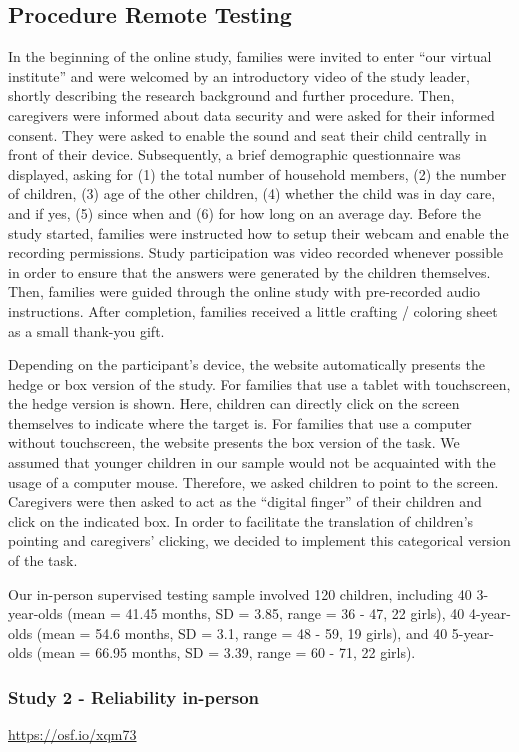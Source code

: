 \documentclass[
  english,
  man,floatsintext]{apa6}
\begin{document}
\hypertarget{procedure-remote-testing}{%
\subsection{Procedure Remote Testing}\label{procedure-remote-testing}}

In the beginning of the online study, families were invited to enter ``our virtual institute'' and were welcomed by an introductory video of the study leader, shortly describing the research background and further procedure. Then, caregivers were informed about data security and were asked for their informed consent. They were asked to enable the sound and seat their child centrally in front of their device. Subsequently, a brief demographic questionnaire was displayed, asking for (1) the total number of household members, (2) the number of children, (3) age of the other children, (4) whether the child was in day care, and if yes, (5) since when and (6) for how long on an average day. Before the study started, families were instructed how to setup their webcam and enable the recording permissions. Study participation was video recorded whenever possible in order to ensure that the answers were generated by the children themselves.
Then, families were guided through the online study with pre-recorded audio instructions. After completion, families received a little crafting / coloring sheet as a small thank-you gift.

Depending on the participant's device, the website automatically presents the hedge or box version of the study. For families that use a tablet with touchscreen, the hedge version is shown. Here, children can directly click on the screen themselves to indicate where the target is. For families that use a computer without touchscreen, the website presents the box version of the task. We assumed that younger children in our sample would not be acquainted with the usage of a computer mouse. Therefore, we asked children to point to the screen. Caregivers were then asked to act as the ``digital finger'' of their children and click on the indicated box. In order to facilitate the translation of children's pointing and caregivers' clicking, we decided to implement this categorical version of the task.

Our in-person supervised testing sample involved 120 children, including 40 3-year-olds (mean = 41.45 months, SD = 3.85, range = 36 - 47, 22 girls), 40 4-year-olds (mean = 54.6 months, SD = 3.1, range = 48 - 59, 19 girls), and 40 5-year-olds (mean = 66.95 months, SD = 3.39, range = 60 - 71, 22 girls).

\hypertarget{study-2---reliability-in-person}{%
\subsubsection{Study 2 - Reliability in-person}\label{study-2---reliability-in-person}}

\url{https://osf.io/xqm73}
\end{document}
